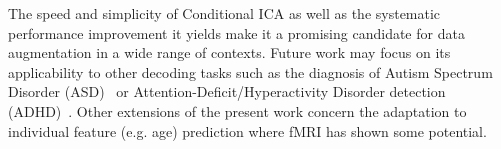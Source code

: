 %
The speed and simplicity of Conditional ICA
as well as the systematic performance improvement it yields
make it a promising candidate for data augmentation in a wide range of
contexts. Future work may focus on its applicability to other decoding tasks
such as the diagnosis of Autism Spectrum Disorder
(ASD)~\cite{eslami2019asd,eslami2019auto,dvornek2017identifying} or
Attention-Deficit/Hyperactivity Disorder detection (ADHD)~\cite{mao2019spatio}. Other extensions of the present work concern the adaptation to
individual feature (e.g. age) prediction where
fMRI has shown some potential.
%